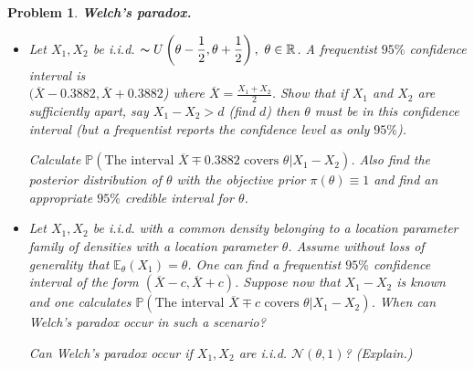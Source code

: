 \documentclass[12pt]{article}
\theoremstyle{problemstyle}
\newtheorem{pbm}{Problem}
\newenvironment{problem}{
\begin{tcolorbox}[colback=green!10!white,colframe=black!75!black, parbox = false]\begin{pbm} }{\end{pbm}\end{tcolorbox} }
\newcommand{\prob}{\mathbb{P}}
\newcommand{\E}{\mathbb{E}}
\newcommand{\normal}{\mathcal{N}}
\newcommand{\R}{\mathbb{R}}
\begin{document}
\begin{problem}
\textbf{Welch’s paradox.}
\begin{itemize}
    \item[(a)]  Let $X_1, X_2$ be i.i.d. $\thicksim U\left(\theta-\dfrac{1}{2},\theta+\dfrac{1}{2}\right),\ \theta\in \R$. A frequentist $95\%$ confidence interval is\\
    $(\overline{X}-0.3882, \overline{X}+0.3882$) where $\overline{X} =
\frac{X_1 + X_2}{2}$. Show that if $X_1$ and $X_2$ are sufficiently apart, say $X_1-X_2 > d$ (find $d$) then $\theta$ must be in this confidence interval (but a frequentist reports the confidence level as only $95\%$).

Calculate $\prob\left(\text{The interval $\overline{X}\mp 0.3882$ covers $\theta$}| X_1-X_2\right)$. Also find the posterior distribution of $\theta$ with the objective prior $\pi(\theta) \equiv 1$ and find an appropriate $95\%$ credible interval for $\theta$.

\item[(b)] Let $X_1, X_2$ be i.i.d. with a common density belonging to a location parameter family of densities with a location parameter $\theta$. Assume without loss of generality that $\E_{\theta} (X_1) =\theta$. One can find a frequentist $95\%$ confidence interval of the form $(\overline{X}-c,\overline{X}+c)$. Suppose now that $X_1-X_2$ is known and one calculates $\prob\left(\text{The interval $\overline{X}\mp c$  covers } \theta |X_1-X_2\right)$. When can Welch’s paradox occur in such a scenario?

Can Welch’s paradox occur if $X_1, X_2$ are i.i.d. $\normal(\theta, 1)$? (Explain.)
\end{itemize}
\end{problem}
\end{document}
